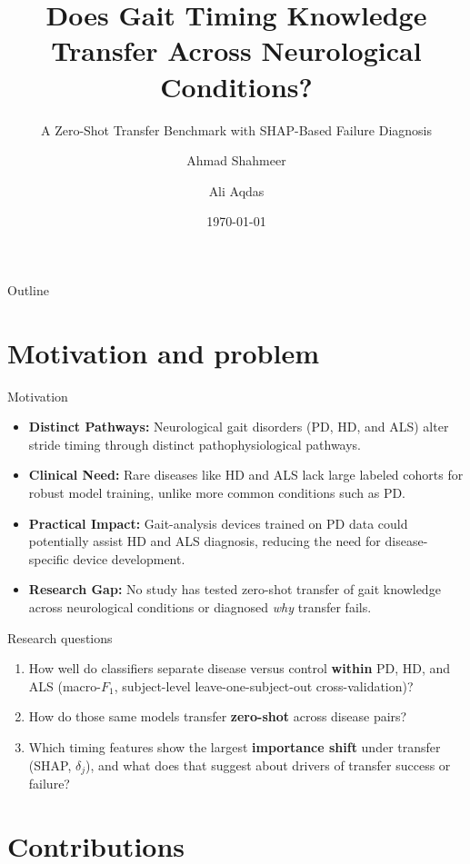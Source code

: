 \documentclass[aspectratio=43,10pt]{beamer}
\title{Does Gait Timing Knowledge Transfer Across Neurological Conditions?}
\subtitle{A Zero-Shot Transfer Benchmark with SHAP-Based Failure Diagnosis}
\author{Ahmad Shahmeer \and Ali Aqdas}
\institute{SEECS $|$ NUST \\}
\date{\today}
\begin{document}
\begin{frame}
  \titlepage
\end{frame}

\begin{frame}{Outline}
  \tableofcontents
\end{frame}

\section{Motivation and problem}

\begin{frame}{Motivation}
  \begin{itemize}
    \item \textbf{Distinct Pathways:} Neurological gait disorders (PD, HD, and ALS) alter stride timing through distinct pathophysiological pathways.
    \item \textbf{Clinical Need:} Rare diseases like HD and ALS lack large labeled cohorts for robust model training, unlike more common conditions such as PD.
    \item \textbf{Practical Impact:} Gait-analysis devices trained on PD data could potentially assist HD and ALS diagnosis, reducing the need for disease-specific device development.
    \item \textbf{Research Gap:} No study has tested zero-shot transfer of gait knowledge across neurological conditions or diagnosed \emph{why} transfer fails.
  \end{itemize}
\end{frame}

\begin{frame}{Research questions}
  \begin{enumerate}
    \item How well do classifiers separate disease versus control \textbf{within} PD, HD, and ALS (macro-$F_1$, subject-level leave-one-subject-out cross-validation)?
    \item How do those same models transfer \textbf{zero-shot} across disease pairs?
    \item Which timing features show the largest \textbf{importance shift} under transfer (SHAP, \textbf{$\delta_j$}), and what does that suggest about drivers of transfer success or failure?
  \end{enumerate}
\end{frame}

\section{Contributions}
\end{document}
